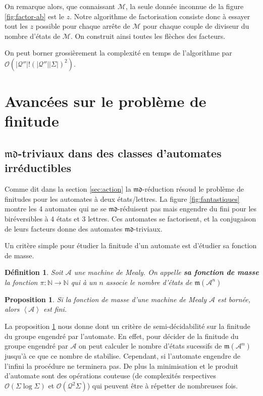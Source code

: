 \documentclass[11pt,a4paper]{article}
\newtheorem{prop}{Proposition}
\newtheorem{definition}{Définition}
\begin{document}
On remarque alors, que connaissant $\mathcal{M}$, la seule donnée inconnue de la figure \ref{fig:factor-ab} est le $z$. Notre algorithme de factorisation consiste donc à essayer tout les $z$ possible pour chaque arrête de $\mathcal{M}$ pour chaque couple de diviseur du nombre d'états de $\mathcal{M}$. On construit ainsi toutes les flèches des facteurs.

On peut borner grossièrement la complexité en temps de l'algorithme par $\mathcal{O}(|\mathcal{Q''}|!\left(|\mathcal{Q''}||\Sigma|\right)^2)$.

\section{Avancées sur le problème de finitude}

\subsection{$\mathfrak{md}$-triviaux dans des classes d'automates irréductibles}

Comme dit dans la section \ref{sec:action} la $\mathfrak{md}$-réduction résoud le problème de finitudes pour les automates à deux états/lettres. La figure \ref{fig:fantastiques} montre les 4 automates qui ne se $\mathfrak{md}$-réduisent pas mais engendre du fini pour les biréversibles à 4 états et 3 lettres. Ces automates se factorisent, et la conjugaison de leurs facteurs donne des automates $\mathfrak{md}$-triviaux.

Un critère simple pour étudier la finitude d'un automate est d'étudier sa fonction de masse.

\begin{definition}
  Soit $\mathcal{A}$ une machine de Mealy. On appelle \textbf{\textit{sa fonction de masse}} la fonction $\pi:\mathbb{N}\rightarrow\mathbb{N}$ qui à un $n$ associe le nombre d'états de $\mathfrak{m}\left(\mathcal{A}^n\right)$
\end{definition}

\begin{prop}
  \label{prop:mass}
  Si la fonction de masse d'une machine de Mealy $\mathcal{A}$ est bornée, alors $\left<\mathcal{A}\right>$ est fini.
\end{prop}

La proposition \ref{prop:mass} nous donne dont un critère de semi-décidabilité sur la finitude du groupe engendré par l'automate. En effet, pour décider de la finitude du groupe engendré par $\mathcal{A}$ on peut calculer le nombre d'états sucessifs de $\mathfrak{m}\left(\mathcal{A}^n\right)$ jusqu'à ce que ce nombre de stabilise. Cependant, si l'automate engendre de l'infini la procédure ne terminera pas. De plus la minimisation et le produit d'automate sont des opérations couteuse (de complexités respectives $\mathcal{O}\left(\Sigma\log\Sigma\right)$ et $\mathcal{O}\left(\mathcal{Q}^2\Sigma\right)$) qui peuvent être à répetter de nombreuses fois.
\end{document}
